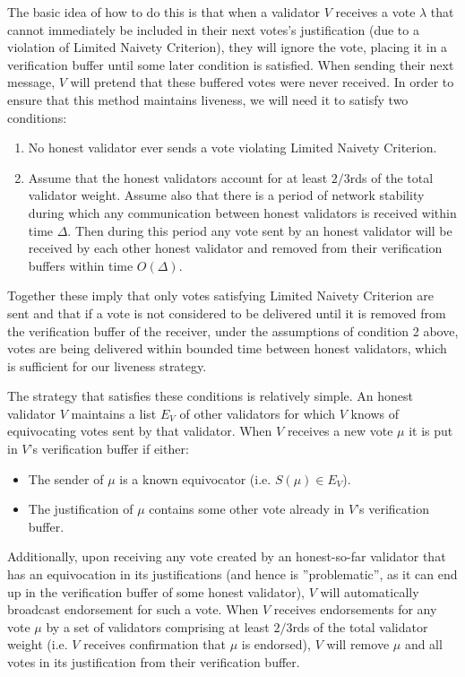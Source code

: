 \documentclass[12pt, fleqn]{article}
\begin{document}
The basic idea of how to do this is that when a validator $V$ receives a vote $\lambda$ that cannot immediately be included in their next votes's justification (due to a violation of Limited Naivety Criterion), they will ignore the vote, placing it in a verification buffer until some later condition is satisfied. When sending their next message, $V$ will pretend that these buffered votes were never received. In order to ensure that this method maintains liveness, we will need it to satisfy two conditions:
\begin{enumerate}
\item No honest validator ever sends a vote violating Limited Naivety Criterion.
\item Assume that the honest validators account for at least $2/3$rds of the total validator weight. Assume also that there is a period of network stability during which any communication between honest validators is received within time $\Delta$. Then during this period any vote sent by an honest validator will be received by each other honest validator and removed from their verification buffers within time $O(\Delta)$.
\end{enumerate}
Together these imply that only votes satisfying Limited Naivety Criterion are sent and that if a vote is not considered to be delivered until it is removed from the verification buffer of the receiver, under the assumptions of condition 2 above, votes are being delivered within bounded time between honest validators, which is sufficient for our liveness strategy.

The strategy that satisfies these conditions is relatively simple. An honest validator $V$ maintains a list $E_V$ of other validators for which $V$ knows of equivocating votes sent by that validator. When $V$ receives a new vote $\mu$ it is put in $V$'s verification buffer if either:
\begin{itemize}
\item The sender of $\mu$ is a known equivocator (i.e. $S(\mu) \in E_V$).
\item The justification of $\mu$ contains some other vote already in $V$'s verification buffer.
\end{itemize}
Additionally, upon receiving any vote created by an honest-so-far validator that has an equivocation in its justifications (and hence is ''problematic'', as it can end up in the verification buffer of some honest validator), $V$ will automatically broadcast endorsement for such a vote. 
When $V$ receives endorsements for any vote $\mu$ by a set of validators comprising at least $2/3$rds of the total validator weight (i.e. $V$ receives confirmation that $\mu$ is endorsed), $V$ will remove $\mu$ and all votes in its justification from their verification buffer.
\end{document}
